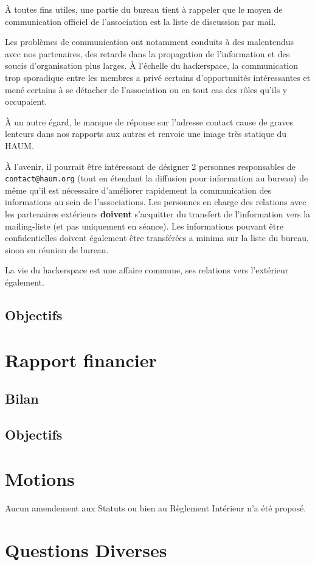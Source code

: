 \documentclass[11pt,twosided]{article}
\begin{document}
À toutes fins utiles, une partie du bureau tient à rappeler que le moyen de communication officiel de l'association est la liste de discussion par mail.

Les problèmes de communication ont notamment conduits à des malentendus avec nos partenaires, des retards dans la propagation de l'information et des soucis d'organisation plus larges. À l'échelle du hackerspace, la communication trop sporadique entre les membres a privé certains d'opportunités intéressantes et mené certains à se détacher de l'association ou en tout cas des rôles qu'ils y occupaient.

À un autre égard, le manque de réponse sur l'adresse contact cause de graves lenteurs dans nos rapports aux autres et renvoie une image très statique du HAUM.

À l'avenir, il pourrait être intéressant de désigner 2 personnes responsables de \texttt{contact@haum.org} (tout en étendant la diffusion pour information au bureau) de même qu'il est nécessaire d'améliorer rapidement la communication des informations au sein de l'associations. Les personnes en charge des relations avec les partenaires extérieurs \textbf{doivent} s'acquitter du transfert de l'information vers la mailing-liste (et pas uniquement en séance). Les informations pouvant être confidentielles doivent également être transférées a minima sur la liste du bureau, sinon en réunion de bureau.

La vie du hackerspace est une affaire commune, ses relations vers l'extérieur également.

\subsection{Objectifs}


\section{Rapport financier}
\subsection{Bilan}
\subsection{Objectifs}

\section{Motions}
Aucun amendement aux Statuts ou bien au Règlement Intérieur n'a été proposé.

\section{Questions Diverses}
\end{document}
